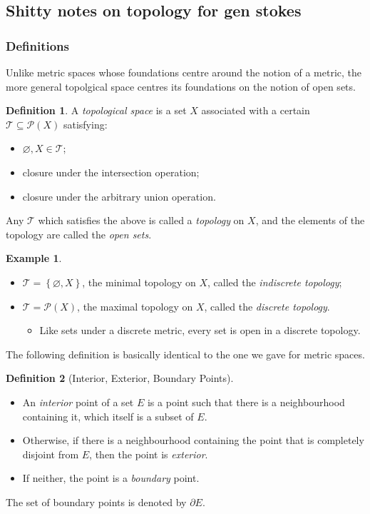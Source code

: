 \documentclass{article}
\theoremstyle{definition}
\newtheorem{defn}{Definition}[subsubsection]
\newtheorem{example}{Example}[subsubsection]
\begin{document}
\newpage
\subsection{Shitty notes on topology for gen stokes}
\subsubsection{Definitions}
Unlike metric spaces whose foundations centre around the notion of a metric, the more general topolgical space centres its foundations on the notion of open sets.
\begin{defn}
	A \emph{topological space} is a set $X$ associated with a certain $\mathcal{T}\subseteq\mathscr{P}(X)$ satisfying:
	\begin{itemize}
		\item $\varnothing,X\in\mathcal{T}$;
		\item closure under the intersection operation;
		\item closure under the arbitrary union operation.
	\end{itemize}
	Any $\mathcal{T}$ which satisfies the above is called a \emph{topology} on $X$, and the elements of the topology are called the \emph{open sets}.
\end{defn}
\begin{example}
	$ $\\
	\begin{itemize}
		\item $\mathcal{T}=\left\{\varnothing,X\right\}$, the minimal topology on $X$, called the \emph{indiscrete topology};
		\item $\mathcal{T}=\mathscr{P}(X)$, the maximal topology on $X$, called the \emph{discrete topology}. 
		\begin{itemize}
			\item Like sets under a discrete metric, every set is open in a discrete topology.
		\end{itemize}
	\end{itemize}
\end{example}
The following definition is basically identical to the one we gave for metric spaces.
\begin{defn}[Interior, Exterior, Boundary Points]
	$ $\\
	\begin{itemize}
		\item An \emph{interior} point of a set $E$ is a point such that there is a neighbourhood containing it, which itself is a subset of $E$.
		\item Otherwise, if there is a neighbourhood containing the point that is completely disjoint from $E$, then the point is \emph{exterior}.
		\item If neither, the point is a \emph{boundary} point.
	\end{itemize}
	The set of boundary points is denoted by $\partial E$.
\end{defn}
\end{document}
